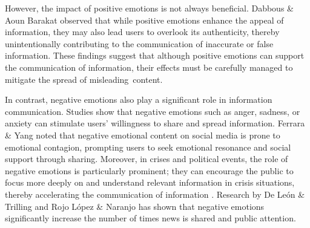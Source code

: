 However, the impact of positive emotions is not always beneficial. Dabbous \& Aoun Barakat \cite{dabbous2023influence} observed that while positive emotions enhance the appeal of information, they may also lead users to overlook its authenticity, thereby unintentionally contributing to the communication of inaccurate or false information. These findings suggest that although positive emotions can support the communication of information, their effects must be carefully managed to mitigate the spread of misleading~content.

In contrast, negative emotions also play a significant role in information communication. Studies show that negative emotions such as anger, sadness, or anxiety can stimulate users' willingness to share and spread information. Ferrara \& Yang \cite{ferrara2015measuring} noted that negative emotional content on social media is prone to emotional contagion, prompting users to seek emotional resonance and social support through sharing. Moreover, in crises and political events, the role of negative emotions is particularly prominent; they can encourage the public to focus more deeply on and understand relevant information in crisis situations, thereby accelerating the communication of information \cite{sanford2004negative}. Research by De León \& Trilling  \cite{de2021sadness} and Rojo López \& Naranjo \cite{lopez2021translating} has shown that negative emotions significantly increase the number of times news is shared and public attention. 

